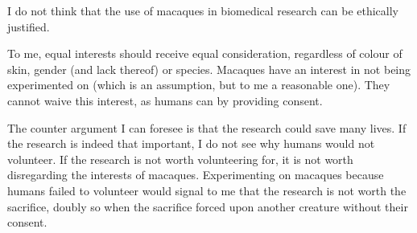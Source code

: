 \documentclass{article}
\begin{document}
\title{}
\author{}
\date{}

\maketitle

I do not think that the use of macaques in biomedical research can be ethically justified.

To me, equal interests should receive equal consideration, regardless of colour of skin, gender (and lack thereof) or species. Macaques have an interest in not being experimented on (which is an assumption, but to me a reasonable one). They cannot waive this interest, as humans can by providing consent. 

The counter argument I can foresee is that the research could save many lives. If the research is indeed that important, I do not see why humans would not volunteer. If  the research is not worth volunteering for, it is not worth disregarding the interests of macaques. Experimenting on macaques because humans failed to volunteer would signal to me that the research is not worth the sacrifice, doubly so when the sacrifice forced upon another creature without their consent. 



		
		
		
		
\end{document}
